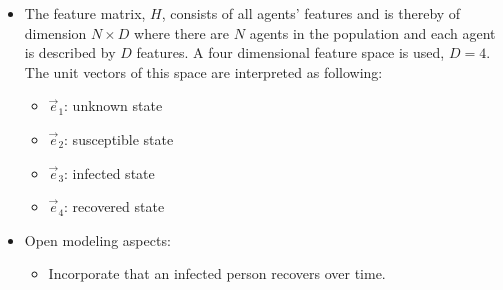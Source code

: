 \documentclass[]{article}
\begin{document}
\begin{itemize}
\begin{itemize}
	\end{itemize}
	\item The feature matrix, $H$, consists of all agents' features and is thereby of dimension $N\times D$ where there are $N$ agents in the population and each agent is described by $D$ features. A four dimensional feature space is used, $D=4$. The unit vectors of this space are interpreted as following:
	\begin{itemize}
		\item $\vec{e}_1$: unknown state
		\item $\vec{e}_2$: susceptible state
		\item $\vec{e}_3$: infected state
		\item $\vec{e}_4$: recovered state
	\end{itemize}
	\item Open modeling aspects:
	\begin{itemize}
		\item Incorporate that an infected person recovers over time.
	\end{itemize}
\end{itemize}
\end{document}
